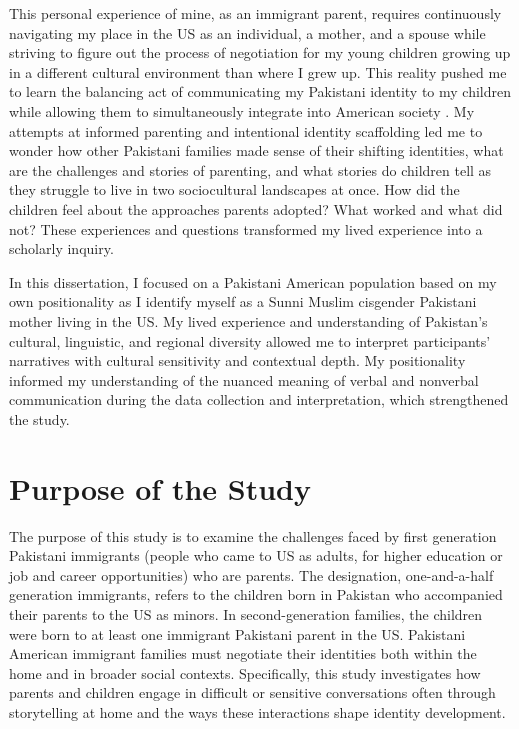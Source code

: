 This personal experience of mine, as an immigrant parent, requires continuously navigating my place in the US as an individual, a mother, and a spouse while striving to figure out the process of negotiation for my young children growing up in a different cultural environment than where I grew up. This reality pushed me to learn the balancing act of communicating my Pakistani identity to my children while allowing them to simultaneously integrate into American society \citep{farooqPoeticAutoethnographyPath2025a}.  My attempts at informed parenting and intentional identity scaffolding led me to wonder how other Pakistani families made sense of their shifting identities, what are the challenges and stories of parenting, and what stories do children tell as they struggle to live in two sociocultural landscapes at once. How did the children feel about the approaches parents adopted? What worked and what did not? These experiences and questions transformed my lived experience into a scholarly inquiry. 

In this dissertation, I focused on a Pakistani American population based on my own positionality as I identify myself as a Sunni Muslim cisgender Pakistani mother living in the US. My lived experience and understanding of Pakistan’s cultural, linguistic, and regional diversity allowed me to interpret participants’ narratives with cultural sensitivity and contextual depth. My positionality informed my understanding of the nuanced meaning of verbal and nonverbal communication during the data collection and interpretation, which strengthened the study.

\section{Purpose of the Study}

The purpose of this study is to examine the challenges faced by first generation Pakistani immigrants (people who came to US as adults, for higher education or job and career opportunities) who are parents. The designation, one-and-a-half generation immigrants, refers to the children born in Pakistan who accompanied their parents to the US as minors.  In second-generation families, the children were born to at least one immigrant Pakistani parent in the US.  Pakistani American immigrant families must negotiate their identities both within the home and in broader social contexts. Specifically, this study investigates how parents and children engage in difficult or sensitive conversations often through storytelling at home and the ways these interactions shape identity development. 

